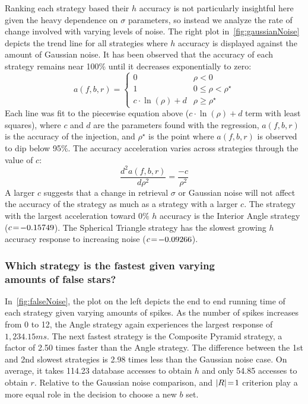 Ranking each strategy based their $h$ accuracy is not particularly insightful here given the heavy dependence on
$\sigma$ parameters, so instead we analyze the rate of change involved with varying levels of noise.
The right plot in~\autoref{fig:gaussianNoise} depicts the trend line for all strategies where $h$ accuracy is displayed
against the amount of Gaussian noise.
It has been observed that the accuracy of each strategy remains near 100\% until it decreases exponentially to zero:
\begin{equation}
    a(f, b, r) =
    \begin{cases}
        0 & \rho < 0 \\
        1 & 0 \leq \rho < \rho^{\star} \\
        c \cdot \ln(\rho) + d & \rho \geq \rho^{\star}
    \end{cases}
\end{equation}
Each line was fit to the piecewise equation above ($c\cdot \ln(\rho) + d$ term with least squares), where $c$ and $d$
are the parameters found with the regression, $a(f, b, r)$ is the accuracy of the injection, and $\rho^{\star}$ is the
point where $a(f, b, r)$ is observed to dip below 95\%.
The accuracy acceleration varies across strategies through the value of $c$:
\begin{equation}
    \frac{d^{2}a(f, b, r)}{d\rho^2} = \frac{-c}{\rho^2}
\end{equation}
A larger $c$ suggests that a change in retrieval $\sigma$ or Gaussian noise will not affect the accuracy of the strategy
as much as a strategy with a larger $c$.
The strategy with the largest acceleration toward $0\%$ $h$ accuracy is the Interior Angle strategy ($c \!=\! -0.15749$).
The Spherical Triangle strategy has the slowest growing $h$ accuracy response to increasing noise ($c \!=\! -0.09266$).

\subsubsection{Which strategy is the fastest given varying \\ amounts of false stars?}
In~\autoref{fig:falseNoise}, the plot on the left depicts the end to end running time of each strategy given varying
amounts of spikes.
As the number of spikes increases from 0 to 12, the Angle strategy again experiences the largest response of
$1{,}234.15\si{ms}$.
The next fastest strategy is the Composite Pyramid strategy, a factor of 2.50 times faster than the Angle strategy.
The difference between the 1st and 2nd slowest strategies is 2.98 times less than the Gaussian noise case.
On average, it takes 114.23 database accesses to obtain $h$ and only 54.85 accesses to obtain $r$.
Relative to the Gaussian noise comparison,  and $\left| R \right| \!=\! 1$ criterion play a more equal role in
the decision to choose a new $b$ set.

